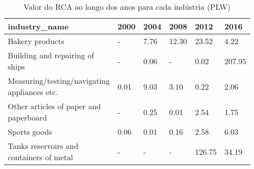 \begin{table}
\centering
\caption{Valor do RCA ao longo dos anos para cada indústria (PLW)}
\begin{tabular}{p{6cm}p{1.5cm}p{1.5cm}p{1.5cm}p{1.5cm}p{1.5cm}}
\toprule
                               industry\_name & 2000 & 2004 &  2008 &   2012 &   2016 \\
\midrule
                             Bakery products &    - & 7.76 & 12.30 &  23.52 &   4.22 \\
             Building and repairing of ships &    - & 0.06 &     - &   0.02 & 207.95 \\
Measuring/testing/navigating appliances etc. & 0.01 & 9.03 &  3.10 &   0.22 &   2.06 \\
      Other articles of paper and paperboard &    - & 0.25 &  0.01 &   2.54 &   1.75 \\
                                Sports goods & 0.06 & 0.01 &  0.16 &   2.58 &   6.03 \\
    Tanks reservoirs and containers of metal &    - &    - &     - & 126.75 &  34.19 \\
\bottomrule
\end{tabular}
\end{table}
